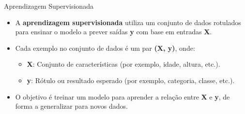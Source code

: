 \documentclass{beamer}
\begin{document}
\begin{frame}[fragile]{Aprendizagem Supervisionada}
    \begin{itemize}
        \item A \textbf{aprendizagem supervisionada} utiliza um conjunto de dados rotulados para ensinar o modelo a prever saídas \textbf{y} com base em entradas \textbf{X}.
        \item Cada exemplo no conjunto de dados é um par \textbf{(X, y)}, onde:
        \begin{itemize}
            \item \textbf{X}: Conjunto de características (por exemplo, idade, altura, etc.).
            \item \textbf{y}: Rótulo ou resultado esperado (por exemplo, categoria, classe, etc.).
        \end{itemize}
        \item O objetivo é treinar um modelo para aprender a relação entre \textbf{X} e \textbf{y}, de forma a generalizar para novos dados.
    \end{itemize}
    
    \vspace{0.5cm}
    
        
        
    
\end{frame}
\end{document}
